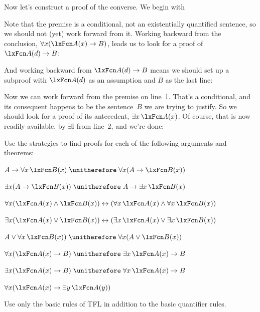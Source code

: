 Now let's construct a proof of the converse. We begin with
\begin{fitchproof}
	\PR
	\ellipsesline
\end{fitchproof}
Note that the premise is a conditional, not an existentially quantified sentence, so we should not (yet) work forward from it. Working backward from the conclusion, $\forall x(\atom{A}{x} \eif B)$, leads us to look for a proof of $\atom{A}{d} \eif B$:
\begin{fitchproof}
	\PR
	\ellipsesline
\end{fitchproof}
And working backward from $\atom{A}{d} \eif B$ means we should set up a subproof with $\atom{A}{d}$ as an assumption and $B$ as the last line:
\begin{fitchproof}
	\PR
	\open
	\AS
	\ellipsesline
	\close
\end{fitchproof}
Now we can work forward from the premise on line~1. That's a conditional, and its consequent happens to be the sentence~$B$ we are trying to justify. So we should look for a proof of its antecedent, $\exists x\,\atom{A}{x}$. Of course, that is now readily available, by $\exists$I from line~2, and we're done:
\begin{fitchproof}
	\PR
	\open
	\AS
	\close
\end{fitchproof}

\practiceproblems

\problempart
Use the strategies to find proofs for each of the following arguments and theorems:
\begin{compactlist}
\item $A \eif \forall x\,\atom{B}{x} \therefore \forall x(A \eif \atom{B}{x})$
\item $\exists x(A \eif \atom{B}{x}) \therefore A \eif \exists x\, \atom{B}{x}$
\item $\forall x(\atom{A}{x} \eand \atom{B}{x}) \eiff (\forall x\,\atom{A}{x} \eand \forall x\,\atom{B}{x})$
\item $\exists x(\atom{A}{x} \eor \atom{B}{x}) \eiff (\exists x\,\atom{A}{x} \eor \exists x\,\atom{B}{x})$
\item $A \eor \forall x\,\atom{B}{x}) \therefore \forall x(A \eor \atom{B}{x})$
\item $\forall x(\atom{A}{x} \eif B) \therefore \exists x\,\atom{A}{x} \eif B$
\item $\exists x(\atom{A}{x} \eif B) \therefore \forall x\,\atom{A}{x} \eif B$
\item $\forall x(\atom{A}{x} \eif \exists y\,\atom{A}{y})$
\end{compactlist}
Use only the basic rules of TFL in addition to the basic quantifier rules.

